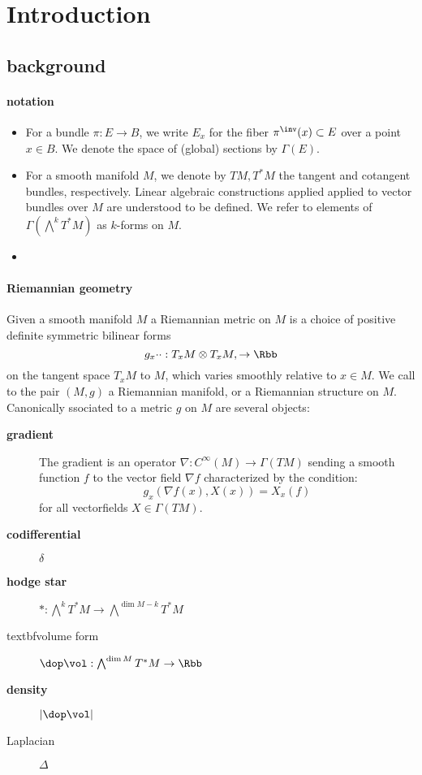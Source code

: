 \chapter{Introduction}
\section{background}
\subsubsection{notation}
\begin{itemize}
    \item For a bundle $\pi : E \to B$, we write $E_x$ for the fiber $\pi^\inv (x) \subset E$ over a point $x\in B$. We denote the space of (global) sections by $\Gamma(E)$.
    \item For a smooth manifold $M$, we denote by $TM,T^*M$ the tangent and cotangent bundles, respectively. Linear algebraic constructions applied applied to vector bundles over $M$ are understood to be defined. We refer to elements of $\Gamma(\bigwedge^k T^*M)$ as $k$-forms on $M$.
    \item
\end{itemize}
\subsubsection{Riemannian geometry}
Given a smooth manifold $M$ a Riemannian metric on $M$ is a choice of positive definite symmetric bilinear forms
\[g_x{\cdot}{\cdot}: T_x M \otimes T_x M, \to \Rbb\]
on the tangent space $T_x M$ to $M$, which varies smoothly relative to $x\in M$. We call to the pair $(M,g)$ a Riemannian manifold, or a Riemannian structure on $M$.
Canonically ssociated to a metric $g$ on $M$ are several objects:
\begin{description}
    \item[\textbf{gradient}] The gradient is an operator $\nabla: C^\infty(M) \to  \Gamma(TM)$ sending a smooth function $f$ to the vector field $\nabla f$ characterized by the condition: \[ g_x(\nabla f(x),X(x))=X_x(f) \]
        for all vectorfields $X \in \Gamma(TM)$.
    \item[\textbf{codifferential}] $\delta$
    \item[\textbf{hodge star}] $*:\bigwedge^k T^* M \to \bigwedge^{\dim M - k} T^*M$
    \item[textbf{volume form}] $\dop \vol : \bigwedge^{\dim M} T^* M \to \Rbb$
    \item[\textbf{density}] $|\dop \vol|$
    \item[Laplacian] $\Delta$
\end{description}


